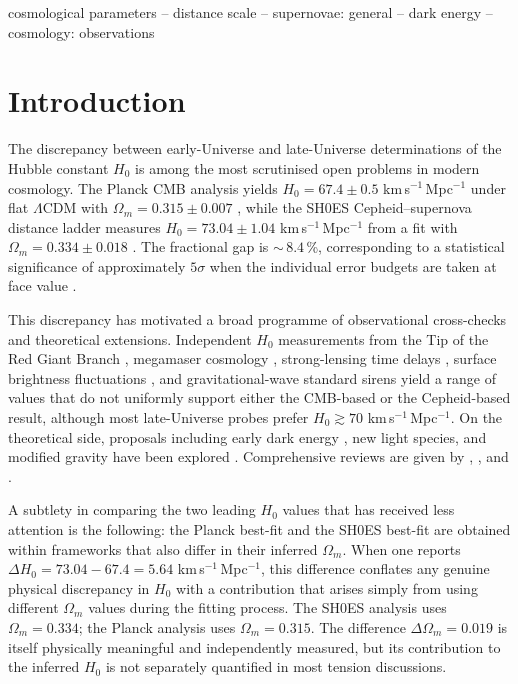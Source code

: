 \documentclass[fleqn,usenatbib,useAMS]{mnras}
\begin{document}
\begin{keywords}
cosmological parameters -- distance scale -- supernovae: general -- dark energy -- cosmology: observations
\end{keywords}


\section{Introduction}
\label{sec:intro}

The discrepancy between early-Universe and late-Universe determinations of the
Hubble constant $H_0$ is among the most scrutinised open problems in
modern cosmology.
The Planck CMB analysis yields
$H_0 = 67.4 \pm 0.5$ km\,s$^{-1}$\,Mpc$^{-1}$
under flat $\Lambda$CDM with $\Omega_m = 0.315 \pm 0.007$
\citep{planck2020}, while the SH0ES Cepheid--supernova distance ladder
measures
$H_0 = 73.04 \pm 1.04$ km\,s$^{-1}$\,Mpc$^{-1}$
from a fit with $\Omega_m = 0.334 \pm 0.018$ \citep{riess2022}.
The fractional gap is ${\sim}\,8.4$\,\%,
corresponding to a statistical significance of approximately
$5\sigma$ when the individual error budgets are taken at face value
\citep{verde2019,divalentino2021,perivolaropoulos2022}.

This discrepancy has motivated a broad programme of observational
cross-checks and theoretical extensions.
Independent $H_0$ measurements from the Tip of the Red Giant Branch
\citep{freedman2019,freedman2021,freedman2024},
megamaser cosmology \citep{pesce2020},
strong-lensing time delays \citep{wong2020,birrer2020},
surface brightness fluctuations \citep{blakeslee2021},
and gravitational-wave standard sirens \citep{abbott2017gw}
yield a range of values that do not uniformly support either the
CMB-based or the Cepheid-based result, although most late-Universe
probes prefer $H_0 \gtrsim 70$ km\,s$^{-1}$\,Mpc$^{-1}$.
On the theoretical side, proposals including early dark energy
\citep{poulin2019,knox2020,kamionkowski2023},
new light species, and modified gravity have been explored
\citep{vagnozzi2021,vagnozzi2023,abdalla2022}.
Comprehensive reviews are given by \citet{shah2021},
\citet{divalentino2021}, and \citet{perivolaropoulos2022}.

A subtlety in comparing the two leading $H_0$ values that has received
less attention is the following: the Planck best-fit and the SH0ES
best-fit are obtained within frameworks that also differ in their
inferred $\Omega_m$.
When one reports $\Delta H_0 = 73.04 - 67.4 = 5.64$
km\,s$^{-1}$\,Mpc$^{-1}$, this difference conflates any genuine
physical discrepancy in $H_0$ with a contribution that arises simply
from using different $\Omega_m$ values during the fitting process.
The SH0ES analysis uses $\Omega_m = 0.334$; the Planck analysis
uses $\Omega_m = 0.315$.
The difference $\Delta\Omega_m = 0.019$ is itself physically
meaningful and independently measured, but its contribution to the
inferred $H_0$ is not separately quantified in most tension discussions.
\end{document}

